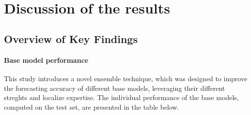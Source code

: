 \chapter{Discussion of the results}

\section{Overview of Key Findings}
\subsubsection{Base model performance}
This study introduces a novel ensemble technique, which was designed to improve the forecasting accuracy of different base models, leveraging their different streghts and localize expertise. The individual performance of the base models, computed on the test set, are presented in the table below.
\begin{table}[h]
    \centering
    \caption{Performance metrics of base models on S\&P500 dataset}
    \label{tab:model performance on S&P 500}
\end{table}

